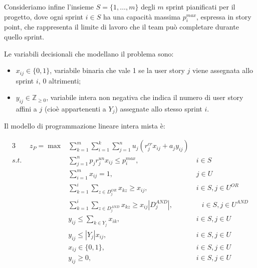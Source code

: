 \documentclass[12pt,a4paper,openright,twoside]{book}
\begin{document}
Consideriamo infine l'insieme \( S = \{1, \ldots, m\} \) degli \( m \) sprint pianificati per il progetto, dove ogni sprint \( i \in S \) ha una capacità massima \( p^{max}_i \), espressa in story point, che rappresenta il limite di lavoro che il team può completare durante quello sprint.

Le variabili decisionali che modellano il problema sono:
\begin{itemize}
    \item \( x_{ij} \in \{0,1\} \), variabile binaria che vale 1 se la user story \( j \) viene assegnata allo sprint \( i \), 0 altrimenti;
    \item \( y_{ij} \in \mathbb{Z}_{\geq 0} \), variabile intera non negativa che indica il numero di user story affini a \( j \) (cioè appartenenti a \( Y_j \)) assegnate allo stesso sprint \( i \).
\end{itemize}

Il modello di programmazione lineare intera mista è:

\begin{alignat}{3}
 \qquad z_P  = \max  & \sum_{k=1}^m \sum_{i=1}^{k} \sum_{j=1}^{n} u_j \left( r_j^{cr} x_{ij} + a_j y_{ij} \right)
                                                                               &\                        \label{Eq1.P1}\\
  s.t.\ & \sum_{j=1}^{n} p_j r_j^{un} x_{ij} \leq p_i^{max},                   &\ i \in S                \label{Eq1.P2}\\
        & \sum_{i=1}^{m} x_{ij} = 1,                                           &\ j \in U                \label{Eq1.P3}\\
        & \sum_{k=1}^{i} \sum_{z \in D_j^{OR}} x_{kz} \geq x_{ij},             &\ i \in S, j \in U^{OR}  \label{Eq1.P4}\\
        & \sum_{k=1}^{i} \sum_{z \in D_j^{AND}} x_{kz} \geq x_{ij}|D_j^{AND}|, &\quad i \in S, j \in U^{AND} \label{Eq1.P5}\\
        & y_{ij} \leq \sum_{k \in Y_j} x_{ik},                                 &\ i \in S, j \in U       \label{Eq1.P6}\\
        & y_{ij} \leq |Y_j| x_{ij},                                            &\ i \in S, j \in U       \label{Eq1.P7}\\
        & x_{ij} \in \{0,1\},                                                  &\ i \in S, j \in U       \label{Eq1.P8}\\
        & y_{ij} \geq 0,                                                       &\ i \in S, j \in U       \label{Eq1.P9}
\end{alignat}
\end{document}
